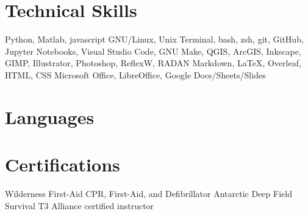 \documentclass[a4paper,12pt,sans,colorlinks]{moderncv}
\begin{document}


\section{Technical Skills}

{
    Python, Matlab, javascript
}
{
    GNU/Linux, Unix Terminal, bash, zsh, git, GitHub, Jupyter Notebooks,
    Visual Studio Code, GNU Make, QGIS, ArcGIS, Inkscape, GIMP, Illustrator,
    Photoshop, ReflexW, RADAN
}
{
    Markdown, \LaTeX, Overleaf, HTML, CSS
}
{
    Microsoft Office, LibreOffice, Google Docs/Sheets/Slides
}

\section{Languages}


\section{Certifications}

{
    Wilderness First-Aid
}
{
    CPR, First-Aid, and Defibrillator
}
{
    Antarctic Deep Field Survival
}
{
    T3 Alliance certified instructor
}
\end{document}
